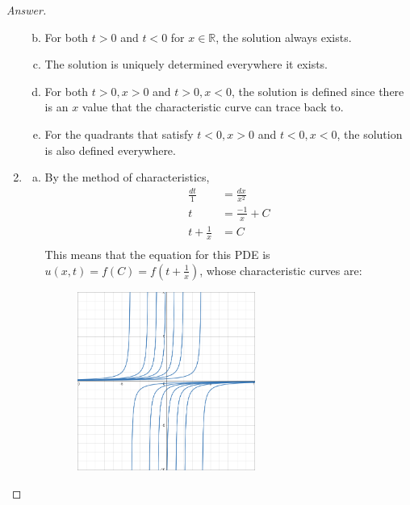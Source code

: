 \documentclass{article}
\theoremstyle{definition}
\renewcommand\qedsymbol{$\blacksquare$}
\newenvironment{ans}{\begin{proof}[Answer]\renewcommand{\qedsymbol}{}}{\end{proof}}
\newcommand{\R}{\mathbb{R}}
\begin{document}
\begin{ans}
\begin{enumerate}[(1), series=answers]
\begin{enumerate}[a)]
\begin{center}
                    \end{center}
                    
                    \item For both $t > 0$ and $t < 0$ for $x \in \R$, the solution always exists.

                    \item The solution is uniquely determined everywhere it exists.

                    \item For both \underline{$t > 0, x > 0$} and \underline{$t > 0, x < 0$}, the solution is defined since there is an $x$ value that the characteristic curve can trace back to.

                    \item For the quadrants that satisfy \underline{$t < 0, x > 0$} and \underline{$t < 0, x < 0$}, the solution is also defined everywhere.
                \end{enumerate}
			
			\item \begin{enumerate}[a)]
                    \item By the method of characteristics,   
                    \begin{align*}
                        \frac{dt}{1} &= \frac{dx}{x^2}\\
                        t &= \frac{-1}{x} + C\\
                        t + \frac{1}{x} &= C\\
                    \end{align*}
                    This means that the equation for this PDE is $\boxed{u(x,t)=f\left(C\right)=f\left(t + \frac{1}{x}\right)}$, whose characteristic curves are:

                    \begin{figure}[H]
                        \centering
                        \includegraphics[width=2.3in]{7 graph.png}
                    \end{figure}
                    

\end{enumerate}
\end{enumerate}
\end{ans}
\end{document}
